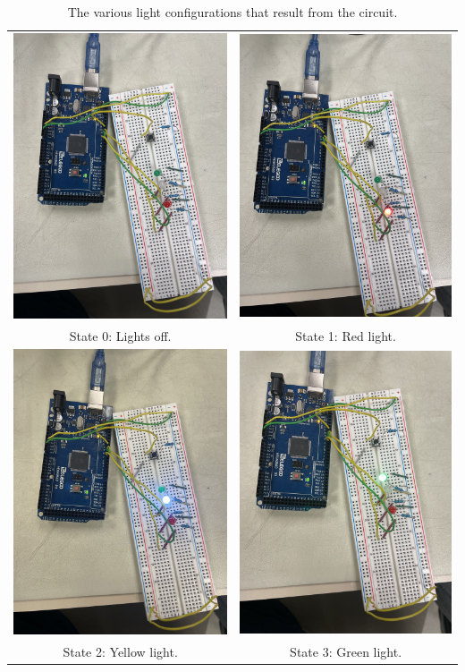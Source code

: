 \documentclass{article}
\begin{document}
\begin{table}[]
    \centering
    \begin{tabular}{|c|c|}
         \hline
            \includegraphics[width=0.28\linewidth]{off.jpg} &
            \includegraphics[width=0.28\linewidth]{red.jpg}
            \\
            State 0: Lights off.&
            State 1: Red light.
            \\
        \hline
            \includegraphics[width=0.28\linewidth]{yellow.jpg}&
            \includegraphics[width=0.28\linewidth]{green.jpg} 
            \\
            State 2: Yellow light.&
            State 3: Green light.
            \\
        \hline
    \end{tabular}
    \caption{The various light configurations that result from the circuit.}
    \label{tab:light-configs}
\end{table}
\end{document}
